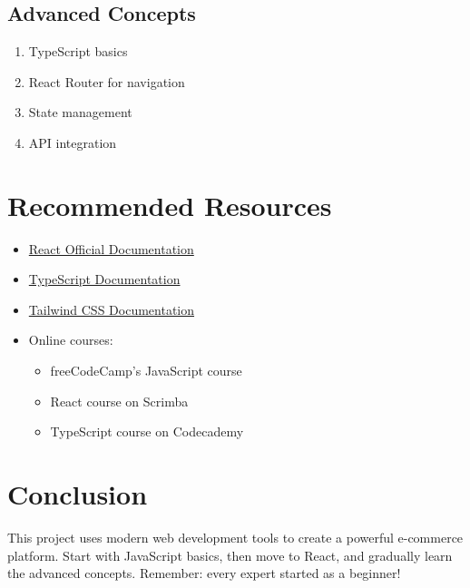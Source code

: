\documentclass{article}
\begin{document}
\subsection{Advanced Concepts}
\begin{enumerate}
    \item TypeScript basics
    \item React Router for navigation
    \item State management
    \item API integration
\end{enumerate}

\section{Recommended Resources}
\begin{itemize}
    \item \href{https://react.dev}{React Official Documentation}
    \item \href{https://www.typescriptlang.org/docs/}{TypeScript Documentation}
    \item \href{https://tailwindcss.com/docs}{Tailwind CSS Documentation}
    \item Online courses:
    \begin{itemize}
        \item freeCodeCamp's JavaScript course
        \item React course on Scrimba
        \item TypeScript course on Codecademy
    \end{itemize}
\end{itemize}

\section{Conclusion}
This project uses modern web development tools to create a powerful e-commerce platform. Start with JavaScript basics, then move to React, and gradually learn the advanced concepts. Remember: every expert started as a beginner!
\end{document}
